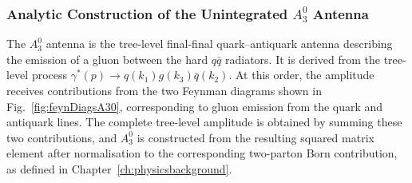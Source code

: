\subsubsection*{Analytic Construction of the Unintegrated $A_3^0$ Antenna}

The $A_3^0$ antenna is the tree-level final-final quark--antiquark antenna describing the emission of a
gluon between the hard $q\bar q$ radiators. It is derived from the tree-level process
$\gamma^*(p)\to q(k_1)g(k_3)\bar q(k_2)$.
At this order, the amplitude receives contributions from the two Feynman diagrams shown in
Fig.~\ref{fig:feynDiagsA30}, corresponding to gluon emission from the quark and antiquark lines. The
complete tree-level amplitude is obtained by summing these two contributions, and $A_3^0$ is
constructed from the resulting squared matrix element after normalisation to the corresponding
two-parton Born contribution, as defined in Chapter~\ref{ch:physicsbackground}.

